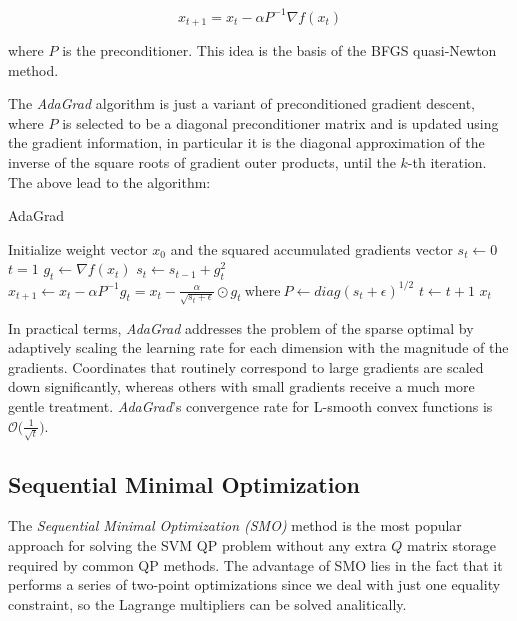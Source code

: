 $$
x_{t+1} = x_t - \alpha P^{-1} \nabla f(x_t)
$$

where $P$ is the preconditioner. This idea is the basis of the BFGS quasi-Newton method.

The \emph{AdaGrad} \cite{duchi2011adaptive} algorithm is just a variant of preconditioned gradient descent, where $P$ is selected to be a diagonal preconditioner matrix and is updated using the gradient information, in particular it is the diagonal approximation of the inverse of the square roots of gradient outer products, until the $k$-th iteration. The above lead to the algorithm:

\begin{algorithm}[H]
	\caption{AdaGrad}
	\label{alg:adagrad}
	\begin{algorithmic}
			\State Initialize weight vector $x_0$ and the squared accumulated gradients vector $s_t \gets 0$
			\State $t = 1$
				\State $g_t \gets \nabla f(x_t)$
				\State $s_t \gets s_{t-1} + g_t^2$
				\State $x_{t+1} \gets x_t - \alpha P^{-1} g_t = x_t - \displaystyle \frac{\alpha}{\sqrt{s_t + \epsilon}} \odot g_t \ \text{where} \ P \gets diag(s_t + \epsilon)^{1/2}$
				\State $t \gets t + 1$
			\EndWhile
			\State \Return $x_t$
		\EndFunction
	\end{algorithmic}
\end{algorithm}

In practical terms, \emph{AdaGrad} addresses the problem of the sparse optimal by adaptively scaling the learning rate for each dimension with the magnitude of the gradients. Coordinates that routinely correspond to large gradients are scaled down significantly, whereas others with small gradients receive a much more gentle treatment. \emph{AdaGrad}'s convergence rate for L-smooth convex functions is $\displaystyle \mathcal{O}\Big(\frac{1}{\sqrt{t}}\Big)$.

\pagebreak

\subsection{Sequential Minimal Optimization}

The \emph{Sequential Minimal Optimization (SMO)} \cite{platt1998sequential} method is the most popular approach for solving the SVM QP problem without any extra $Q$ matrix storage required by common QP methods. The advantage of SMO lies in the fact that it performs a series of two-point optimizations since we deal with just one equality constraint, so the Lagrange multipliers can be solved analitically.

